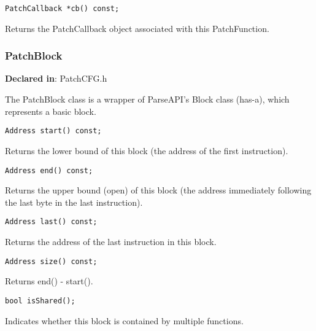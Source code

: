 \begin{verbatim}
PatchCallback *cb() const;

\end{verbatim}



Returns the PatchCallback object associated with this PatchFunction.

\subsubsection{PatchBlock}
\label{sec-3.2.10}

\textbf{Declared in}: PatchCFG.h

The PatchBlock class is a wrapper of ParseAPI's Block class (has-a), which
represents a basic block.


\begin{verbatim}
Address start() const;

\end{verbatim}



Returns the lower bound of this block (the address of the first instruction).


\begin{verbatim}
Address end() const;

\end{verbatim}



Returns the upper bound (open) of this block (the address immediately following
the last byte in the last instruction).


\begin{verbatim}
Address last() const;

\end{verbatim}



Returns the address of the last instruction in this block.


\begin{verbatim}
Address size() const;

\end{verbatim}



Returns end() - start().


\begin{verbatim}
bool isShared();

\end{verbatim}



Indicates whether this block is contained by multiple functions.


